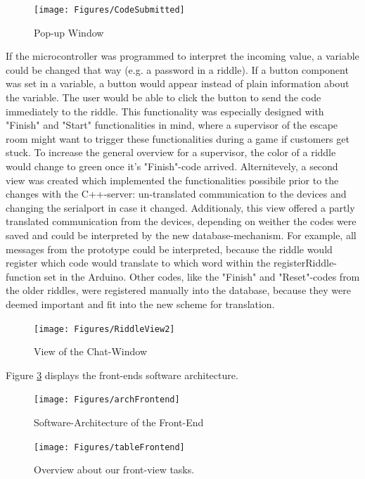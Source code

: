 \begin{figure}[b]
	\centering
	\texttt{[image: Figures/CodeSubmitted]}
	\decoRule
	\caption[Pop-up-Window]{Pop-up Window}
	\label{fig:popup}
\end{figure}
If the microcontroller was programmed to interpret the incoming value, a variable could be changed that way (e.g. a password in a riddle).
If a button component was set in a variable, a button would appear instead of plain information about the variable.
The user would be able to click the button to send the code immediately to the riddle.
This functionality was especially designed with "Finish" and "Start" functionalities in mind, where a supervisor of the escape room might want to trigger these functionalities during a game if customers get stuck.
To increase the general overview for a supervisor, the color of a riddle would change to green once it's "Finish"-code arrived.
Alternitevely, a second view was created which implemented the functionalities possibile prior to the changes with the C++-server: 
un-translated communication to the devices and changing the serialport in case it changed. 
Additionaly, this view offered a partly translated communication from the devices, 
depending on weither the codes were saved and could be interpreted by the new database-mechanism. 
For example, all messages from the prototype could be interpreted, 
because the riddle would register which code would translate to which word within the registerRiddle-function set in the Arduino.
Other codes, like the "Finish" and "Reset"-codes from the older riddles, were registered manually into the database, because they were deemed important and fit into the new scheme for translation.

\begin{figure}[t]
    \centering
	\texttt{[image: Figures/RiddleView2]}
	\decoRule
	\caption[Chat-Window]{View of the Chat-Window}
	\label{fig:RiddleView2}
\end{figure}

Figure \ref{fig:archFrontend} displays the front-ends software architecture. 

\begin{figure}[t]
    \centering
	\texttt{[image: Figures/archFrontend]}
	\decoRule
	\caption[Front-End-Architecture]{Software-Architecture of the Front-End}
	\label{fig:archFrontend}
\end{figure}

\begin{figure}[th]
	\centering
	\texttt{[image: Figures/tableFrontend]}
	\decoRule
	\caption[FrontViewTable]{Overview about our front-view tasks.}
	\label{fig:FrontViewTable}
\end{figure}



